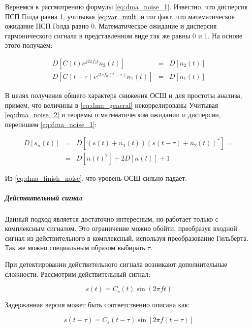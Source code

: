 Вернемся к рассмотрению формулы \ref{eq:dma_noise_1}. Известно, что дисперсия ПСП Голда равна 1, учитывая \ref{eq:var_mult}
и тот факт, что математическое ожидание ПСП Голда равно 0. Математическое ожидание и дисперсия гармонического сигнала в
представленном виде так же равны 0 и 1. На основе этого получаем:
\begin{center}
\begin{eqnarray}
	\label{eq:dma_noise_2}
	D[C(t)e^{j2{\pi}f_{0}t}n_{2}(t)] & = & D[n_{2}(t)] \nonumber \\
	D[C(t-\tau)e^{j2{\pi}f_{0}(t-\tau)}n_{1}(t)] & = & D[n_{1}(t)]
\end{eqnarray}
\end{center}

В целях получения общего характера снижения ОСШ и для простоты анализа, примем, что величины в \ref{eq:dma_general} некоррелированы
Учитывая \ref{eq:dma_noise_2} и теоремы о математическом ожидании и дисперсии, перепишем \ref{eq:dma_noise_1}:
\begin{center}
\begin{eqnarray}
	\label{eq:dma_finish_noise}
	D[s_{n}(t)] & = & D[(s(t)+n_{1}(t))(s(t-\tau)+n_{2}(t))^{*}]=\nonumber \\
	& = & D[n(t)^{2}] + 2D[n(t)] + 1 \label{eq:dma_noise_3}
\end{eqnarray}
\end{center}

Из \ref{eq:dma_finish_noise}, что уровень ОСШ сильно падает.

\subparagraph{Действительный сигнал}
\label{sec1:dma_real}

Данный подход является достаточно интересным, но работает только с комплексным сигналом. Это ограничение можно
обойти, преобразуя входной сигнал из действительного в комплексный, используя преобразование Гильберта.
Так же можно специальным образом выбирать ${\tau}$.

При детектировании действительного сигнала возникают дополнительные сложности. Рассмотрим действительный сигнал:
\begin{center}
\begin{equation}
	\label{eq:dma_real1}
	s(t) = C_s(t) \sin{(2\pi ft)}
\end{equation}
\end{center}

Задержанная версия может быть соответственно описана как:
\begin{center}
\begin{equation}
	\label{eq:dma_real2}
	s(t - \tau) = C_s(t-\tau) \sin{\left[2\pi f(t-\tau)\right]}
\end{equation}
\end{center}

